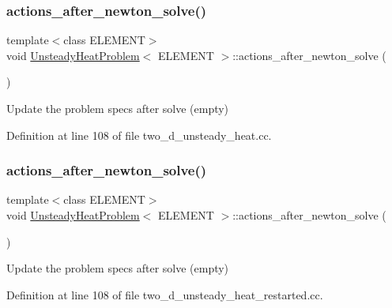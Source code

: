 \subsubsection{\texorpdfstring{actions\+\_\+after\+\_\+newton\+\_\+solve()}{actions\_after\_newton\_solve()}\hspace{0.1cm}{\footnotesize\ttfamily [1/2]}}
{\footnotesize\ttfamily template$<$class E\+L\+E\+M\+E\+NT$>$ \\
void \hyperlink{classUnsteadyHeatProblem}{Unsteady\+Heat\+Problem}$<$ E\+L\+E\+M\+E\+NT $>$\+::actions\+\_\+after\+\_\+newton\+\_\+solve (\begin{DoxyParamCaption}{ }\end{DoxyParamCaption})\hspace{0.3cm}{\ttfamily [inline]}}



Update the problem specs after solve (empty) 



Definition at line 108 of file two\+\_\+d\+\_\+unsteady\+\_\+heat.\+cc.

\mbox{\label{classUnsteadyHeatProblem_a88e3d534b5904f7c10ce6a8fbd6df0ea}} 
\subsubsection{\texorpdfstring{actions\+\_\+after\+\_\+newton\+\_\+solve()}{actions\_after\_newton\_solve()}\hspace{0.1cm}{\footnotesize\ttfamily [2/2]}}
{\footnotesize\ttfamily template$<$class E\+L\+E\+M\+E\+NT$>$ \\
void \hyperlink{classUnsteadyHeatProblem}{Unsteady\+Heat\+Problem}$<$ E\+L\+E\+M\+E\+NT $>$\+::actions\+\_\+after\+\_\+newton\+\_\+solve (\begin{DoxyParamCaption}{ }\end{DoxyParamCaption})\hspace{0.3cm}{\ttfamily [inline]}}



Update the problem specs after solve (empty) 



Definition at line 108 of file two\+\_\+d\+\_\+unsteady\+\_\+heat\+\_\+restarted.\+cc.

